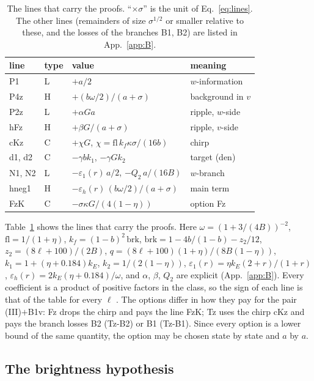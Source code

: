 \begin{table}
\caption{The lines that carry the proofs. ``$\times\sigma$'' is the unit of Eq.~\eqref{eq:lines}. The other lines (remainders of size $\sigma^{1/2}$ or smaller relative to these, and the losses of the branches B1, B2) are listed in App.~\ref{app:B}.}
\label{tab:lines}
\begin{ruledtabular}
\small
\begin{tabular}{p{}p{}p{}p{}}
line & type & value & meaning\\ \hline
P1 & L & $+a/2$ & $w$-information\\
P4z & H & $+(b\omega/2)/(a+\sigma)$ & background in $v$\\
P2z & L & $+\alpha Ga$ & ripple, $w$-side\\
hFz & H & $+\beta G/(a+\sigma)$ & ripple, $v$-side\\
cKz & C & $+\chi G$, $\chi=\mathrm{fl}\,k_f\kappa\sigma/(16b)$ & chirp\\
d1, d2 & C & $-\gamma bk_1$, $-\gamma Gk_2$ & target (den)\\
N1, N2 & L & $-\varepsilon_1(r)\,a/2$, $-Q_2\,a/(16B)$ & $w$-branch\\
hneg1 & H & $-\varepsilon_h(r)\,(b\omega/2)/(a+\sigma)$ & main term\\
FzK & C & $-\sigma\kappa G/(4(1-\eta))$ & option Fz\\
\end{tabular}
\end{ruledtabular}
\end{table}

Table~\ref{tab:lines} shows the lines that carry the proofs.
Here $\omega=(1+3/(4B))^{-2}$, $\mathrm{fl}=1/(1+\eta)$, $k_f=(1-b)^2\,\mathrm{brk}$, $\mathrm{brk}=1-4b/(1-b)-z_2/12$, $z_2=(8\ell+100)/(2B)$, $q=(8\ell+100)(1+\eta)/(8B(1-\eta))$, $k_1=1+(\eta+0.184)k_E$, $k_2=1/(2(1-\eta))$, $\varepsilon_1(r)=\eta k_E(2+r)/(1+r)$, $\varepsilon_h(r)=2k_E(\eta+0.184)/\omega$, and $\alpha$, $\beta$, $Q_2$ are explicit (App.~\ref{app:B}).
Every coefficient is a product of positive factors in the class, so the sign of each line is that of the table for every $\ell$ \proofst.
The options differ in how they pay for the pair (III)$+$B1v: Fz drops the chirp and pays the line FzK; Tz uses the chirp cKz and pays the branch losses B2 (Tz-B2) or B1 (Tz-B1).
Since every option is a lower bound of the same quantity, the option may be chosen state by state and $a$ by $a$.

\subsection{The brightness hypothesis}

